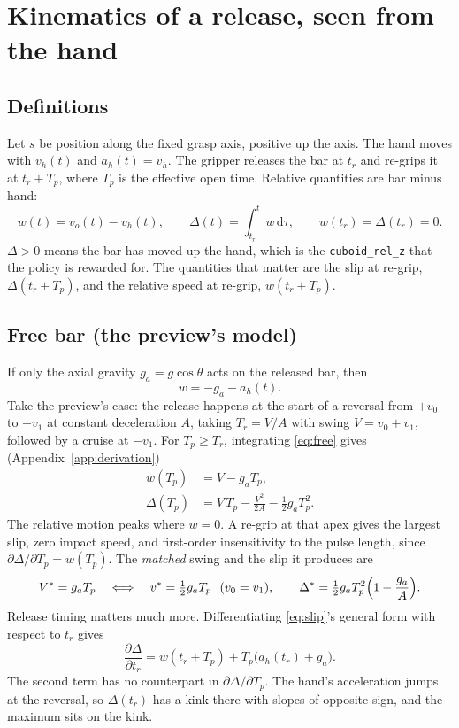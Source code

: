 \documentclass[10.5pt,a4paper]{article}
\newcommand{\code}[1]{\texttt{#1}}
\begin{document}
\section{Kinematics of a release, seen from the hand}
\subsection{Definitions}
Let $s$ be position along the fixed grasp axis, positive up the axis. The hand moves with $v_h(t)$ and
$a_h(t)=\dot v_h$. The gripper releases the bar at $t_r$ and re-grips it at $t_r+T_p$, where $T_p$ is the
effective open time. Relative quantities are bar minus hand:
\begin{equation}
w(t)=v_o(t)-v_h(t),\qquad \Delta(t)=\int_{t_r}^{t} w\,\mathrm d\tau ,\qquad w(t_r)=\Delta(t_r)=0 .
\end{equation}
$\Delta>0$ means the bar has moved up the hand, which is the \code{cuboid\_rel\_z} that the policy is rewarded
for. The quantities that matter are the slip at re-grip, $\Delta(t_r+T_p)$, and the relative speed at re-grip,
$w(t_r+T_p)$.

\subsection{Free bar (the preview's model)}
If only the axial gravity $g_a=g\cos\theta$ acts on the released bar, then
\begin{equation}
\dot w=-g_a-a_h(t).\label{eq:free}
\end{equation}
Take the preview's case: the release happens at the start of a reversal from $+v_0$ to $-v_1$ at constant
deceleration $A$, taking $T_r=V/A$ with swing $V=v_0+v_1$, followed by a cruise at $-v_1$. For
$T_p\ge T_r$, integrating \eqref{eq:free} gives (Appendix~\ref{app:derivation})
\begin{align}
w(T_p)&=V-g_aT_p, \label{eq:wend}\\
\Delta(T_p)&=V\,T_p-\frac{V^2}{2A}-\frac12 g_a T_p^2 . \label{eq:slip}
\end{align}
The relative motion peaks where $w=0$. A re-grip at that apex gives the largest slip, zero impact speed, and
first-order insensitivity to the pulse length, since $\partial\Delta/\partial T_p=w(T_p)$. The \emph{matched}
swing and the slip it produces are
\begin{equation}
V^{*}=g_aT_p\quad\Longleftrightarrow\quad v^{*}=\tfrac12 g_aT_p\ \ (v_0=v_1),\qquad
\Delta^{*}=\tfrac12 g_aT_p^2\Bigl(1-\frac{g_a}{A}\Bigr). \label{eq:match}
\end{equation}
Release timing matters much more. Differentiating \eqref{eq:slip}'s general form with respect to $t_r$ gives
\begin{equation}
\frac{\partial\Delta}{\partial t_r}=w(t_r+T_p)+T_p\bigl(a_h(t_r)+g_a\bigr).\label{eq:sens}
\end{equation}
The second term has no counterpart in $\partial\Delta/\partial T_p$. The hand's acceleration jumps at the
reversal, so $\Delta(t_r)$ has a kink there with slopes of opposite sign, and the maximum sits on the kink.
\end{document}
